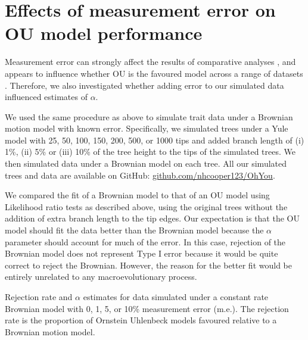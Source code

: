 \documentclass[a4paper,12pt]{article}
\begin{document}
\section{Effects of measurement error on OU model performance}
  Measurement error can strongly affect the results of comparative analyses \citep{silvestro2015}, and appears to influence whether OU is the favoured model across a range of datasets \citep[see][]{pennell2015model}. 
  Therefore, we also investigated whether adding error to our simulated data influenced estimates of $\alpha$.
  
  We used the same procedure as above to simulate trait data under a Brownian motion model with known error. 
  Specifically, we simulated trees under a Yule model with 25, 50, 100, 150, 200, 500, or 1000 tips and added branch length of (i) 1\%, (ii) 5\% or (iii) 10\% of the tree height to the tips of the simulated trees. 
  We then simulated data under a Brownian model on each tree. 
  All our simulated trees and data are available on GitHub: \href{https://github.com/nhcooper123/OhYou}{github.com/nhcooper123/OhYou}.

  We compared the fit of a Brownian model to that of an OU model using Likelihood ratio tests as described above, using the original trees without the addition of extra branch length to the tip edges. 
  Our expectation is that the OU model should fit the data better than the Brownian model because the $\alpha$ parameter should account for much of the error. In this case, rejection of the Brownian model does not represent Type I error because it would be quite correct to reject the Brownian. However, the reason for the better fit would be entirely unrelated to any macroevolutionary process. 

    \begin{landscape}
      \begin{table}[!htbp]
        \begin{center}
        \caption{Rejection rate and $\alpha$ estimates for data simulated under a constant rate Brownian model with 0, 1, 5, or 10\% measurement error (m.e.). The rejection rate is the proportion of Ornstein Uhlenbeck models favoured relative to a Brownian motion model.}
        \bigskip
        
        \label{tables:yule_error}
        \end{center}
\end{table} 
    \end{landscape}
\end{document}
